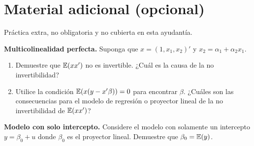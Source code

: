 \documentclass[letterpaper,11pt]{article}
\begin{document}
\section*{Material adicional (opcional)}

\noindent Práctica extra, no obligatoria y no cubierta en esta ayudantía.

\vspace{1em}

\noindent\textbf{Multicolinealidad perfecta.} Suponga que $x=(1,x_1,x_2)'$ y
$x_2=\alpha_1+\alpha_2 x_1$.
\begin{enumerate}
    \item Demuestre que $\operatorname{\mathbb{E}}(xx')$ no es invertible. ¿Cuál es la causa de la no invertibilidad?
    \item Utilice la condición $\operatorname{\mathbb{E}}(x(y-x'\beta))=0$ para encontrar $\beta$. ¿Cuáles son las
    consecuencias para el modelo de regresión o proyector lineal de la no invertibilidad de
    $\operatorname{\mathbb{E}}(xx')$?
\end{enumerate}

\vspace{1em}

\noindent\textbf{Modelo con solo intercepto.} Considere el modelo con solamente un intercepto
$y=\beta_0+u$ donde $\beta_0$ es el proyector lineal. Demuestre que $\beta_0=\operatorname{\mathbb{E}}(y)$.
\end{document}
